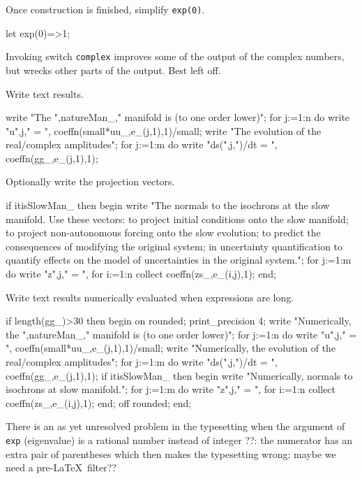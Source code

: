 \documentclass[11pt,a5paper]{article}
\begin{document}
Once construction is finished, simplify \verb|exp(0)|.

\begin{reduce}
let exp(0)=>1;
\end{reduce}

Invoking switch \verb|complex| improves some of the output of the complex numbers, but wrecks other parts of the output.  Best left off.


Write text results.
\begin{reduce}
write "The ",natureMan_," manifold is (to one order lower)";
for j:=1:n do write "u",j," = ",
  coeffn(small*uu_,e_(j,1),1)/small;
write "The evolution of the real/complex amplitudes";
for j:=1:m do write "ds(",j,")/dt = ",
  coeffn(gg_,e_(j,1),1);
\end{reduce}

Optionally write the projection vectors.
\begin{reduce}
if itisSlowMan_ then begin
  write "The normals to the isochrons at the slow manifold.
Use these vectors: to project initial conditions
onto the slow manifold; to project non-autonomous
forcing onto the slow evolution; to predict the
consequences of modifying the original system; in
uncertainty quantification to quantify effects on
the model of uncertainties in the original system.";
  for j:=1:m do write "z",j," = ",
    for i:=1:n collect coeffn(zs_,e_(i,j),1);
end;
\end{reduce}

Write text results numerically evaluated when expressions are long.
\begin{reduce}
if length(gg_)>30 then begin
on rounded; print_precision 4;
write "Numerically, the ",natureMan_," manifold is (to one order lower)";
for j:=1:n do write "u",j," = ",
  coeffn(small*uu_,e_(j,1),1)/small;
write "Numerically, the evolution of the real/complex amplitudes";
for j:=1:m do write "ds(",j,")/dt = ",
  coeffn(gg_,e_(j,1),1);
if itisSlowMan_ then begin
  write "Numerically, normals to isochrons at slow manifold.";
  for j:=1:m do write "z",j," = ",
    for i:=1:n collect coeffn(zs_,e_(i,j),1);
end;
off rounded;
end;
\end{reduce}



There is an as yet unresolved problem in the typesetting when the argument of \verb|exp| (eigenvalue) is a rational number instead of integer ??:
the numerator has an extra pair of parentheses which then makes the typesetting wrong;
maybe we need a pre-\LaTeX\ filter??
\end{document}
